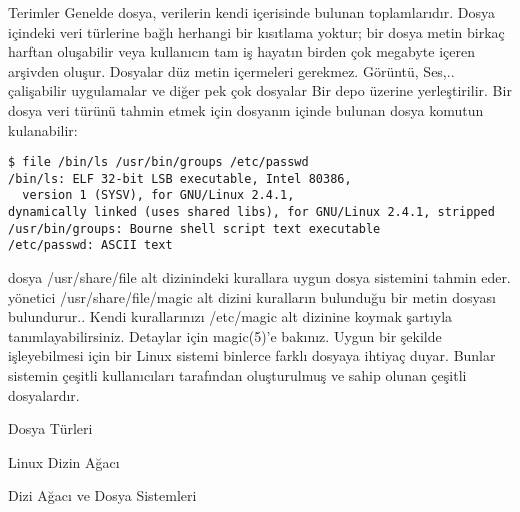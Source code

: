\begin{section}{Terimler}
Genelde dosya, verilerin kendi içerisinde bulunan toplamlarıdır. Dosya içindeki veri türlerine bağlı herhangi bir kısıtlama yoktur; bir dosya metin birkaç harftan oluşabilir veya kullanıcın tam iş hayatın birden çok megabyte içeren arşivden oluşur. Dosyalar düz metin içermeleri gerekmez. Görüntü, Ses,.. çalişabilir uygulamalar ve diğer pek çok dosyalar Bir depo üzerine yerleştirilir. Bir dosya veri türünü tahmin etmek için dosyanın içinde bulunan dosya komutun kulanabilir:

\begin{verbatim}
$ file /bin/ls /usr/bin/groups /etc/passwd
/bin/ls: ELF 32-bit LSB executable, Intel 80386,
  version 1 (SYSV), for GNU/Linux 2.4.1,
dynamically linked (uses shared libs), for GNU/Linux 2.4.1, stripped
/usr/bin/groups: Bourne shell script text executable
/etc/passwd: ASCII text
\end{verbatim}

dosya /usr/share/file alt dizinindeki kurallara uygun dosya sistemini tahmin eder.
yönetici /usr/share/file/magic alt dizini kuralların bulunduğu bir metin dosyası
bulundurur.. Kendi kurallarınızı /etc/magic alt dizinine koymak şartıyla
tanımlayabilirsiniz. Detaylar için magic(5)'e bakınız. Uygun bir şekilde işleyebilmesi için bir Linux sistemi binlerce farklı dosyaya ihtiyaç duyar. Bunlar sistemin çeşitli kullanıcıları tarafından oluşturulmuş ve sahip olunan çeşitli
dosyalardır.

\end{section}
\begin{section}{Dosya Türleri}


\end{section}
\begin{section}{Linux Dizin Ağacı}


\end{section}
\begin{section}{Dizi Ağacı ve Dosya Sistemleri}


\end{section}
